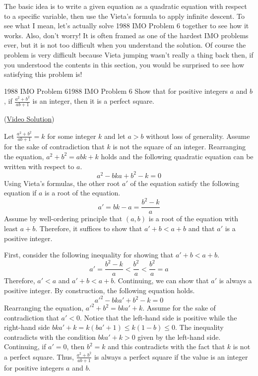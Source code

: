 \documentclass[../../../main.tex]{subfiles}
\begin{document}
The basic idea is to write a given equation as a quadratic
equation with respect to a specific variable, then use the
Vieta's formula to apply infinite descent. To see what I mean,
let's actually solve 1988 IMO Problem 6 together to see how it
works. Also, don't worry! It is often framed as one of the
hardest IMO problems ever, but it is not too difficult when you
understand the solution. Of course the problem is very difficult
because Vieta jumping wasn't really a thing back then, if you
understood the contents in this section, you would be surprised
to see how satisfying this problem is!

\begin{problem}{1988 IMO Problem 6}{1988 IMO Problem 6}
Show that for positive integers $a$ and $b$, if
$\frac{a^2 + b^2}{ab + 1}$ is an integer, then it is a perfect
square.
\end{problem}
(\href{https://youtu.be/rU1e7ttQmh4}{Video Solution})
\begin{solution}
Let $\frac{a^2 + b^2}{ab + 1} = k$ for some integer $k$ and let
$a > b$ without loss of generality. Assume for the sake of
contradiction that $k$ is not the square of an integer.
Rearranging the equation, $a^2 + b^2 = abk + k$ holds and the
following quadratic equation can be written with respect to $a$.
\[
a^2 - bka + b^2 - k = 0
\]
Using Vieta's formulas, the other root $a'$ of the equation satisfy
the following equation if $a$ is a root of the equation.
\[
a'
= bk - a
= \frac{b^2 - k}{a}
\]
Assume by well-ordering principle that $(a, b)$ is a root of the
equation with least $a + b$. Therefore, it suffices to show that
$a' + b < a + b$ and that $a'$ is a positive integer.

First, consider the following inequality for showing that
$a' + b < a + b$.
\[
a'
= \frac{b^2 - k}{a}
< \frac{b^2}{a}
< \frac{b^2}{a}
= a
\]
Therefore, $a' < a$ and $a' + b < a + b$. Continuing, we can show
that $a'$ is always a positive integer. By construction, the following
equation holds.
\[
a'^2 - bka' + b^2 - k = 0
\]
Rearranging the equation, $a'^2 + b^2 = bka' + k$. Assume for the
sake of contradiction that $a' < 0$. Notice that the left-hand
side is positive while the right-hand side $bka' + k = k(ba' + 1) \leq
k(1 - b) \leq 0$. The inequality contradicts with the condition
$bka' + k > 0$ given by the left-hand side. Continuing, if $a' = 0$,
then $b^2 = k$ and this contradicts with the fact that $k$ is not
a perfect square. Thus, $\frac{a^2 + b^2}{ab + 1}$ is always a
perfect square if the value is an integer for positive integers
$a$ and $b$.
\end{solution}
\end{document}

